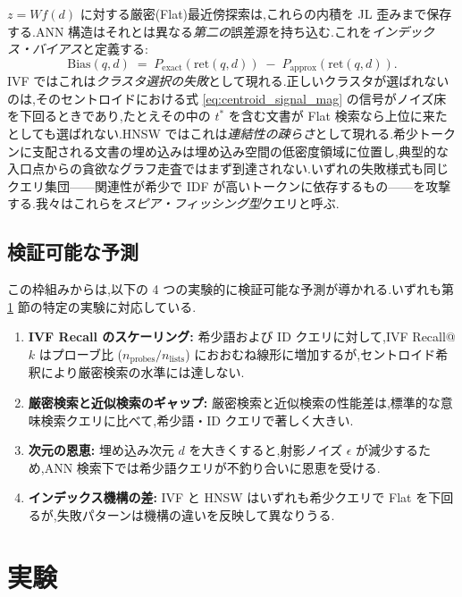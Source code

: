 \documentclass[conference]{IEEEtran}
\begin{document}
$z=Wf(d)$ に対する厳密(Flat)最近傍探索は,これらの内積を JL 歪みまで保存する.ANN 構造はそれとは異なる\emph{第二の}誤差源を持ち込む.これを\emph{インデックス・バイアス}と定義する:
\begin{equation}
\mathrm{Bias}(q,d) \;=\; P_{\text{exact}}(\mathrm{ret}(q,d)) \;-\; P_{\text{approx}}(\mathrm{ret}(q,d)).
\label{eq:indexing_bias}
\end{equation}
IVF ではこれは\emph{クラスタ選択の失敗}として現れる.正しいクラスタが選ばれないのは,そのセントロイドにおける式 \eqref{eq:centroid_signal_mag} の信号がノイズ床を下回るときであり,たとえその中の $t^*$ を含む文書が Flat 検索なら上位に来たとしても選ばれない.HNSW ではこれは\emph{連結性の疎らさ}として現れる.希少トークンに支配される文書の埋め込みは埋め込み空間の低密度領域に位置し,典型的な入口点からの貪欲なグラフ走査ではまず到達されない.いずれの失敗様式も同じクエリ集団——関連性が希少で IDF が高いトークンに依存するもの——を攻撃する.我々はこれらを\emph{スピア・フィッシング型}クエリと呼ぶ.

\subsection{検証可能な予測}\label{sec:predictions}

この枠組みからは,以下の 4 つの実験的に検証可能な予測が導かれる.いずれも第 \ref{sec:experiments} 節の特定の実験に対応している.

\begin{enumerate}
\item \textbf{IVF Recall のスケーリング:} 希少語および ID クエリに対して,IVF Recall@$k$ はプローブ比 ($n_{\text{probes}}/n_{\text{lists}}$) におおむね線形に増加するが,セントロイド希釈により厳密検索の水準には達しない.

\item \textbf{厳密検索と近似検索のギャップ:} 厳密検索と近似検索の性能差は,標準的な意味検索クエリに比べて,希少語・ID クエリで著しく大きい.

\item \textbf{次元の恩恵:} 埋め込み次元 $d$ を大きくすると,射影ノイズ $\epsilon$ が減少するため,ANN 検索下では希少語クエリが不釣り合いに恩恵を受ける.

\item \textbf{インデックス機構の差:} IVF と HNSW はいずれも希少クエリで Flat を下回るが,失敗パターンは機構の違いを反映して異なりうる.
\end{enumerate}

\section{実験}\label{sec:experiments}
\end{document}

